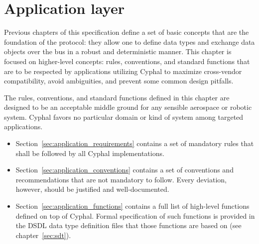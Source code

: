 \chapter{Application layer}\label{sec:application}

Previous chapters of this specification define a set of basic concepts that are the foundation of the protocol:
they allow one to define data types and exchange data objects over the bus in a robust and deterministic manner.
This chapter is focused on higher-level concepts: rules, conventions, and standard functions that are to be
respected by applications utilizing Cyphal to maximize cross-vendor compatibility, avoid ambiguities, and
prevent some common design pitfalls.

The rules, conventions, and standard functions defined in this chapter are designed to be an acceptable middle
ground for any sensible aerospace or robotic system.
Cyphal favors no particular domain or kind of system among targeted applications.

\begin{itemize}
    \item Section~\ref{sec:application_requirements} contains a set of mandatory rules that shall be
    followed by all Cyphal implementations.

    \item Section~\ref{sec:application_conventions} contains a set of conventions and recommendations that
    are not mandatory to follow. Every deviation, however, should be justified and well-documented.

    \item Section~\ref{sec:application_functions} contains a full list of high-level functions defined on
    top of Cyphal. Formal specification of such functions is provided in the DSDL data type definition files that
    those functions are based on (see chapter~\ref{sec:sdt}).
\end{itemize}

\clearpage
\clearpage
\clearpage
